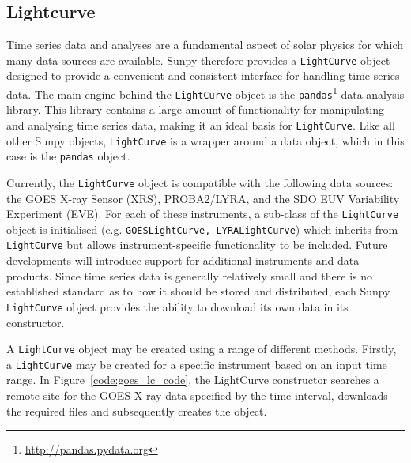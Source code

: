 \subsection{Lightcurve}

Time series data and analyses are a fundamental aspect of solar physics 
for which many data sources are available. 
Sunpy therefore provides a \texttt{LightCurve} object 
designed to provide a convenient and consistent interface for handling 
time series data. 
The main engine behind the \texttt{LightCurve} object is the \texttt{pandas}\footnote{\url{http://pandas.pydata.org}} 
data analysis library. 
This library contains a large amount of functionality for manipulating 
and analysing time series data, making it an ideal basis for 
\texttt{LightCurve}.  
Like all other Sunpy objects, \texttt{LightCurve} is a wrapper around 
a data object, which in this case is the \texttt{pandas} object. 

Currently, the \texttt{LightCurve} object is compatible with the following 
data sources: the GOES X-ray Sensor (XRS), PROBA2/LYRA, 
and the SDO EUV Variability Experiment (EVE). 
For each of these instruments, a sub-class of the \texttt{LightCurve} object 
is initialised (e.g. \texttt{GOESLightCurve, LYRALightCurve}) which inherits 
from \texttt{LightCurve} but allows instrument-specific functionality to be 
included. 
Future developments will introduce support for additional instruments and data 
products. 
Since time series data is generally relatively small and there is no 
established standard as to how it should be stored and distributed, 
each Sunpy \texttt{LightCurve} object provides the ability to download 
its own data in its constructor.


A \texttt{LightCurve} object may be created using a range of different methods. 
Firstly, a \texttt{LightCurve} may be created for a specific instrument based 
on an input time range. In Figure~\ref{code:goes_lc_code}, 
the LightCurve constructor searches a remote site for the GOES X-ray data 
specified by the time interval, downloads the required files and subsequently 
creates the object.

